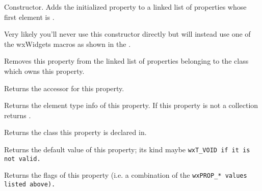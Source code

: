 Constructor. Adds the initialized property to a linked list of  properties 
whose first element is .

Very likely you'll never use this constructor directly but will instead use one of the wxWidgets
macros as shown in the .


\label{wxpropertyinfodtor}


Removes this property from the linked list of properties belonging to the class which owns this property.


\label{wxpropertyinfogetaccessor}


Returns the accessor for this property.


\label{wxpropertyinfogetcollectionelementtypeinfo}


Returns the element type info of this property. If this property is not a collection returns \NULL.


\label{wxpropertyinfogetdeclaringclass}


Returns the class this property is declared in.


\label{wxpropertyinfogetdefaultvalue}


Returns the default value of this property; its kind maybe \tt{wxT\_VOID} if it is not valid.


\label{wxpropertyinfogetflags}


Returns the flags of this property (i.e. a combination of the \tt{wxPROP_*} values listed above).


\label{wxpropertyinfogetgroupstring}


